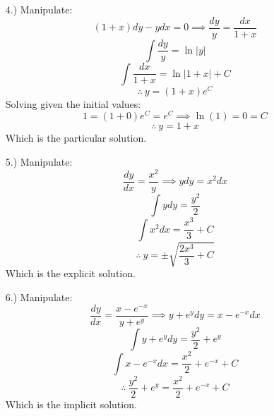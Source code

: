 \documentclass[12pt]{article}
\begin{document}
\begin{itemize}
    \pagebreak
    \item [4.)] Manipulate:
    \begin{equation*}
        (1+x)dy-ydx=0\implies\frac{dy}{y}=\frac{dx}{1+x}
    \end{equation*}
    \begin{equation*}
        \int\frac{dy}{y}=\ln\vert y\vert
    \end{equation*}
    \begin{equation*}
        \int\frac{dx}{1+x}=\ln\vert 1+x\vert+C
    \end{equation*}
    \begin{equation*}
        \therefore\ y=(1+x)e^C
    \end{equation*}
    Solving given the initial values:
    \begin{equation*}
        1=(1+0)e^C=e^C\implies\ln(1)=0=C
    \end{equation*}
    \begin{equation*}
        \therefore\ y=1+x
    \end{equation*}
    Which is the particular solution.

    \item [5.)] Manipulate:
    \begin{equation*}
        \dfrac{dy}{dx}=\frac{x^2}{y}\implies ydy=x^2dx
    \end{equation*}
    \begin{equation*}
        \int ydy=\frac{y^2}{2}
    \end{equation*}
    \begin{equation*}
        \int x^2dx=\frac{x^3}{3}+C
    \end{equation*}
    \begin{equation*}
        \therefore\ y=\pm\sqrt{\frac{2x^3}{3}+C}
    \end{equation*}
    Which is the explicit solution.

    \item [6.)] Manipulate:
    \begin{equation*}
        \dfrac{dy}{dx}=\frac{x-e^{-x}}{y+e^y}\implies y+e^ydy=x-e^{-x}dx
    \end{equation*}
    \begin{equation*}
        \int y+e^ydy=\frac{y^2}{2}+e^y
    \end{equation*}
    \begin{equation*}
        \int x-e^{-x}dx=\frac{x^2}{2}+e^{-x}+C
    \end{equation*}
    \begin{equation*}
        \therefore\ \frac{y^2}{2}+e^y=\frac{x^2}{2}+e^{-x}+C
    \end{equation*}
    Which is the implicit solution.


\end{itemize}
\end{document}
